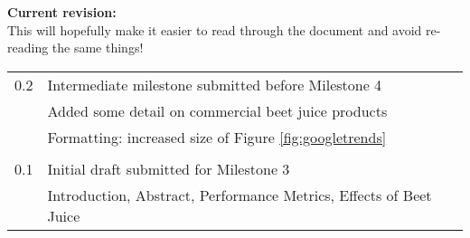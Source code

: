 \begin{tcolorbox}[title=\textbf{Changelog},colbacktitle=white!80!black,coltitle=black,arc=0mm,boxrule=0.2mm]

\textbf{Current revision: \revno}\\
This will hopefully make it easier to read through the document and avoid re-reading the same things!\vspace{1.5em}
    \begin{tabular}{ll}
        0.2 & Intermediate milestone submitted before Milestone 4\\
            & Added some detail on commercial beet juice products\\
            & Formatting: increased size of Figure \ref{fig:googletrends} \\\\
        0.1 &  
            Initial draft submitted for Milestone 3\\
            &Introduction, Abstract, Performance Metrics, Effects of Beet Juice
    \end{tabular}



\end{tcolorbox}
\pagebreak